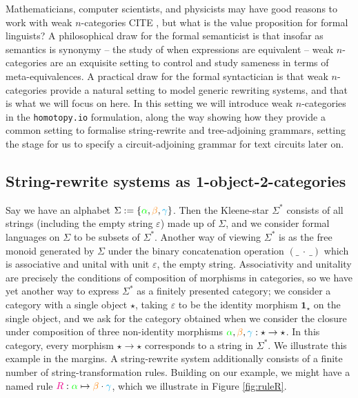 Mathematicians, computer scientists, and physicists may have good reasons to work with weak $n$-categories \bR CITE \e, but what is the value proposition for formal linguists? A philosophical draw for the formal semanticist is that insofar as semantics is synonymy -- the study of when expressions are equivalent -- weak $n$-categories are an exquisite setting to control and study sameness in terms of meta-equivalences. A practical draw for the formal syntactician is that weak $n$-categories provide a natural setting to model generic rewriting systems, and that is what we will focus on here. In this setting we will introduce weak $n$-categories in the \texttt{homotopy.io} formulation, along the way showing how they provide a common setting to formalise string-rewrite and tree-adjoining grammars, setting the stage for us to specify a circuit-adjoining grammar for text circuits later on.

\subsection{String-rewrite systems as 1-object-2-categories}

Say we have an alphabet $\Sigma := \{\textcolor{green}{\alpha}, \textcolor{orange}{\beta}, \textcolor{cyan}{\gamma}\}$. Then the Kleene-star $\Sigma^*$ consists of all strings (including the empty string $\varepsilon$) made up of $\Sigma$, and we consider formal languages on $\Sigma$ to be subsets of $\Sigma^*$. Another way of viewing $\Sigma^*$ is as the free monoid generated by $\Sigma$ under the binary concatenation operation $(\_ \ \cdot \ \_)$ which is associative and unital with unit $\varepsilon$, the empty string. Associativity and unitality are precisely the conditions of composition of morphisms in categories, so we have yet another way to express $\Sigma^*$ as a finitely presented category; we consider a category with a single object $\star$, taking $\varepsilon$ to be the identity morphism $\textbf{1}_\star$ on the single object, and we ask for the category obtained when we consider the closure under composition of three non-identity morphisms $\textcolor{green}{\alpha}, \textcolor{orange}{\beta}, \textcolor{cyan}{\gamma}: \star \rightarrow \star$. In this category, every morphism $\star \rightarrow \star$ corresponds to a string in $\Sigma^*$. We illustrate this example in the margins. A string-rewrite system additionally consists of a finite number of string-transformation rules. Building on our example, we might have a named rule $\textcolor{magenta}{R}: \textcolor{green}{\alpha} \mapsto \textcolor{orange}{\beta} \cdot \textcolor{cyan}{\gamma}$, which we illustrate in Figure \ref{fig:ruleR}.\\


